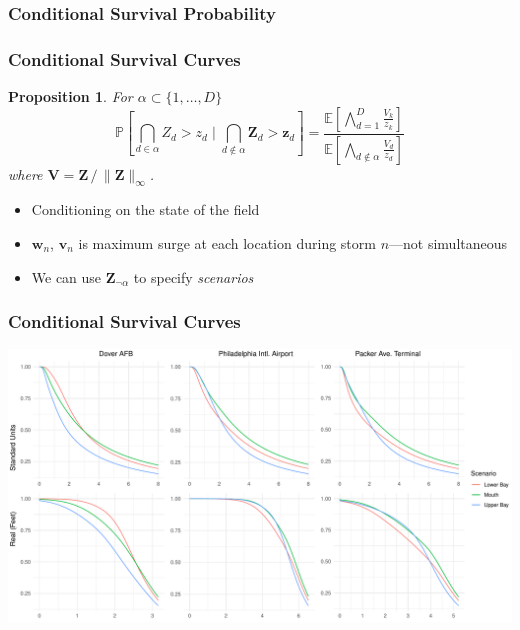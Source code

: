 \documentclass[aspectratio=169,10pt]{beamer}
\newtheorem{prop}{Proposition}
\newlength{\frametextheight}
\begin{document}
\subsubsection{Conditional Survival Probability}

\begin{frame}
    \frametitle{Conditional Survival Curves}
    \begin{prop}
      For $\alpha \subset \lbrace 1, \ldots, D\rbrace$
    \[
        \mathbb{P}\left[\bigcap_{d\in\alpha}Z_{d} > z_d\mid \bigcap_{d\not\in\alpha}\bm{Z}_{d} > \bm{z}_{d}\right] =
        \frac{\mathbb{E}\left[\bigwedge_{d = 1}^D \frac{V_k}{z_k}\right]}{
                      \mathbb{E}\left[\bigwedge_{d\not\in\alpha}\frac{V_d}{z_d}\right]}
    \]
      where $\bm{V} = \bm{Z}\,/\,\lVert\bm{Z}\rVert_{\infty}$.
  \end{prop}
    \begin{itemize}
        \item Conditioning on the state of the field
        \item $\bm{w}_n$, $\bm{v}_n$ is maximum surge at each location during storm $n$---not simultaneous
        \item We can use $\bm{Z}_{\neg\alpha}$ to specify \emph{scenarios}
    \end{itemize}
\end{frame} %

\begin{frame}
    \frametitle{Conditional Survival Curves}
    \begin{center}
        \includegraphics[height=0.99\frametextheight]{./ch3/plots/condsurv/condsurv_1d_mcmc_combined}
    \end{center}
\end{frame} %
\end{document}
